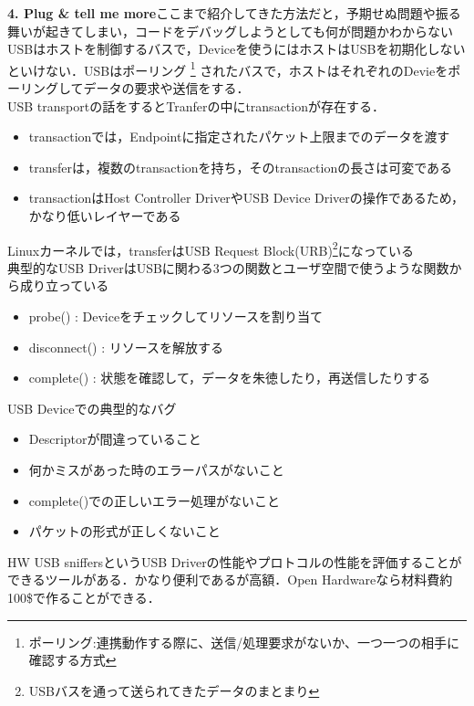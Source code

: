 \documentclass[10pt]{jreport}
\begin{document}
\begin{description}
          \item {\large \textbf{4. Plug \& tell me more}}\mbox\\
          ここまで紹介してきた方法だと，予期せぬ問題や振る舞いが起きてしまい，コードをデバッグしようとしても何が問題かわからない\\
          USBはホストを制御するバスで，Deviceを使うにはホストはUSBを初期化しないといけない．USBはポーリング
          \footnote[3]{ポーリング:連携動作する際に、送信/処理要求がないか、一つ一つの相手に確認する方式}
          されたバスで，ホストはそれぞれのDevieをポーリングしてデータの要求や送信をする．\\
          USB transportの話をするとTranferの中にtransactionが存在する．
          \begin{itemize}
            \item transactionでは，Endpointに指定されたパケット上限までのデータを渡す
            \item transferは，複数のtransactionを持ち，そのtransactionの長さは可変である
            \item transactionはHost Controller DriverやUSB Device Driverの操作であるため，かなり低いレイヤーである
          \end{itemize}
          Linuxカーネルでは，transferはUSB Request Block(URB)\footnote[4]{USBバスを通って送られてきたデータのまとまり}になっている\\
          典型的なUSB DriverはUSBに関わる3つの関数とユーザ空間で使うような関数から成り立っている
          \begin{itemize}
            \item probe()      : Deviceをチェックしてリソースを割り当て
            \item disconnect() : リソースを解放する
            \item complete()   : 状態を確認して，データを朱徳したり，再送信したりする
          \end{itemize}
          USB Deviceでの典型的なバグ
          \begin{itemize}
            \item Descriptorが間違っていること
            \item 何かミスがあった時のエラーパスがないこと
            \item complete()での正しいエラー処理がないこと
            \item パケットの形式が正しくないこと
          \end{itemize}
          HW USB sniffersというUSB Driverの性能やプロトコルの性能を評価することができるツールがある．かなり便利であるが高額．Open Hardwareなら材料費約100\$で作ることができる．\\

\end{description}
\end{document}
